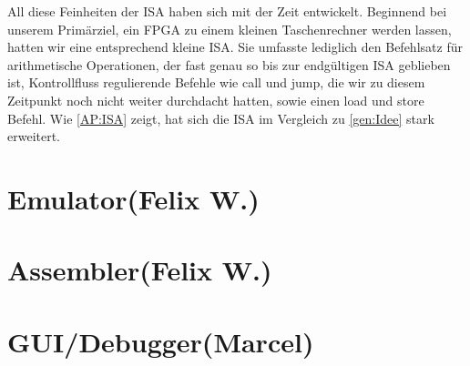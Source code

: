 All diese Feinheiten der ISA haben sich mit der Zeit entwickelt. Beginnend bei unserem Primärziel, ein FPGA zu einem kleinen Taschenrechner werden lassen, hatten wir eine entsprechend kleine ISA. Sie umfasste lediglich den Befehlsatz für arithmetische Operationen, der fast genau so bis zur endgültigen ISA geblieben ist, Kontrollfluss regulierende Befehle wie call und jump, die wir zu diesem Zeitpunkt noch nicht weiter durchdacht hatten, sowie einen load und store Befehl. Wie \autoref{AP:ISA} zeigt, hat sich die ISA im Vergleich zu \autoref{gen:Idee} stark erweitert.


\section{Emulator(Felix W.)}

\section{Assembler(Felix W.)}

\section{GUI/Debugger(Marcel)}

